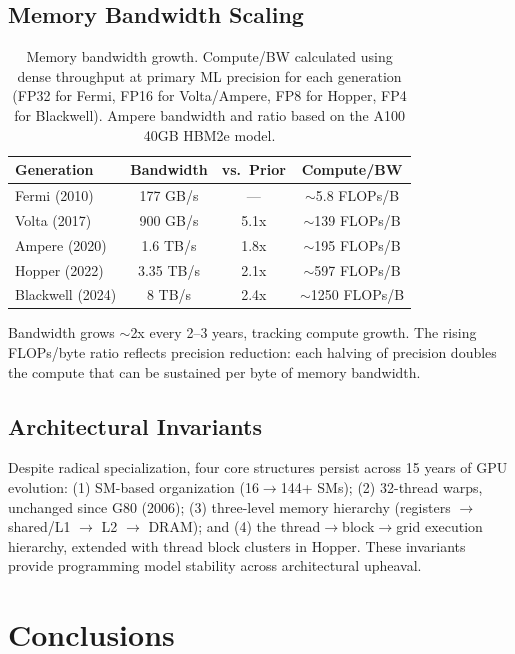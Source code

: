 \documentclass{article}
\begin{document}
\subsection{Memory Bandwidth Scaling}

\begin{table}[h]
\centering\small
\begin{tabular}{lccc}
\toprule
Generation & Bandwidth & vs.\ Prior & Compute/BW \\
\midrule
Fermi (2010) & 177 GB/s & — & $\sim$5.8 FLOPs/B \\
Volta (2017) & 900 GB/s & 5.1x & $\sim$139 FLOPs/B \\
Ampere (2020) & 1.6 TB/s & 1.8x & $\sim$195 FLOPs/B \\
Hopper (2022) & 3.35 TB/s & 2.1x & $\sim$597 FLOPs/B \\
Blackwell (2024) & 8 TB/s & 2.4x & $\sim$1250 FLOPs/B \\
\bottomrule
\end{tabular}
\caption{Memory bandwidth growth. Compute/BW calculated using dense throughput at primary ML precision for each generation (FP32 for Fermi, FP16 for Volta/Ampere, FP8 for Hopper, FP4 for Blackwell). Ampere bandwidth and ratio based on the A100 40GB HBM2e model.}
\end{table}

Bandwidth grows $\sim$2x every 2--3 years, tracking compute growth. The rising FLOPs/byte ratio reflects precision reduction: each halving of precision doubles the compute that can be sustained per byte of memory bandwidth.

\subsection{Architectural Invariants}

Despite radical specialization, four core structures persist across 15 years of GPU evolution: (1) SM-based organization (16$\to$144+ SMs); (2) 32-thread warps, unchanged since G80 (2006); (3) three-level memory hierarchy (registers $\to$ shared/L1 $\to$ L2 $\to$ DRAM); and (4) the thread$\to$block$\to$grid execution hierarchy, extended with thread block clusters in Hopper. These invariants provide programming model stability across architectural upheaval.

\section{Conclusions}
\end{document}
